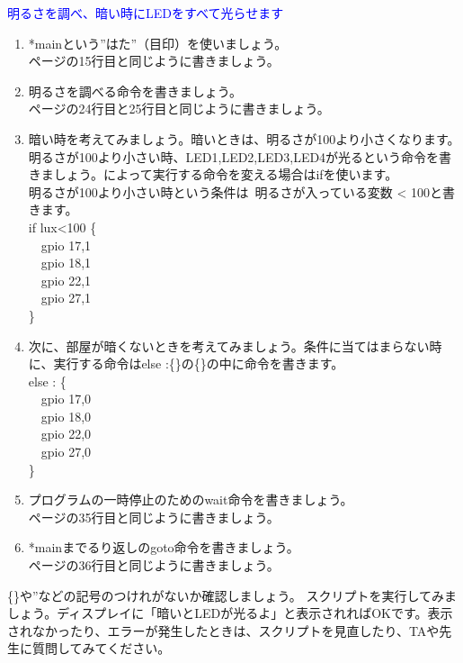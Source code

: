 \begin{enumerate}
\begin{enumerate}
\end{enumerate}
\textcolor{blue}{\item 明るさを調べ、暗い時にLEDをすべて光らせます}
\begin{enumerate}
\item *mainという”はた”（目印）を使いましょう。\\
\pageref{sensors.hsp}ページの15行目と同じように書きましょう。
\item 明るさを調べる命令を書きましょう。\\
\pageref{sensors.hsp}ページの24行目と25行目と同じように書きましょう。
\item 暗い時を考えてみましょう。暗いときは、明るさが100より小さくなります。
明るさが100より小さい時、LED1,LED2,LED3,LED4が光るという命令を書きましょう。によって実行する命令を変える場合はifを使います。\\
明るさが100より小さい時という条件は\ 明るさが入っている変数 < 100と書きます。\\
if lux<100 \{\\
\ \ gpio 17,1\\
\ \ gpio 18,1\\
\ \ gpio 22,1\\
\ \ gpio 27,1\\
\}
\item 次に、部屋が暗くないときを考えてみましょう。条件に当てはまらない時に、実行する命令はelse :\{\}の\{\}の中に命令を書きます。\\
else : \{\\
\ \ gpio 17,0\\
\ \ gpio 18,0\\
\ \ gpio 22,0\\
\ \ gpio 27,0\\
\}
\item プログラムの一時停止のためのwait命令を書きましょう。\\
\pageref{sensors.hsp}ページの35行目と同じように書きましょう。
\item *mainまでるり返しのgoto命令を書きましょう。\\
\pageref{sensors.hsp}ページの36行目と同じように書きましょう。
\end{enumerate}
\item  \{\}や”などの記号のつけれがないか確認しましょう。
スクリプトを実行してみましょう。ディスプレイに「暗いとLEDが光るよ」と表示されればOKです。表示されなかったり、エラーが発生したときは、スクリプトを見直したり、TAや先生に質問してみてください。
\end{enumerate}
